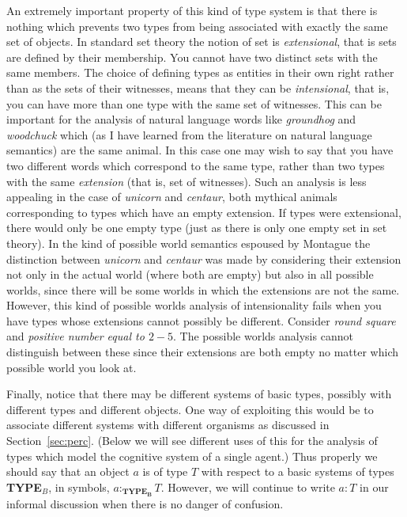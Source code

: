 An extremely important property of this kind of type system is that
there is nothing which prevents two types from being associated with
exactly the same set of objects.  In standard set theory the notion of
set is \textit{extensional}, that is sets are defined by their
membership.  You cannot have two distinct sets with the same members.
The choice of defining types as entities in their own right rather
than as the sets of their witnesses, means that they can be
\textit{intensional}, that is, you can have more than one type with
the same set of witnesses.  This can be important for the analysis of
natural language words like \textit{groundhog} and \textit{woodchuck}
which (as I have learned from the literature on natural language
semantics) are the same animal. In this case one may wish to say that
you have two different words which correspond to the same type, rather
than two types with the same \textit{extension} (that is, set of
witnesses).  Such an analysis is less appealing in the case of
\textit{unicorn} and \textit{centaur}, both mythical animals
corresponding to types which have an empty extension.  If types were
extensional, there would only be one empty type (just as there is only
one empty set in set theory).  In the kind of possible world semantics
espoused by Montague the distinction between \textit{unicorn} and
\textit{centaur} was made by considering their extension not only in
the actual world (where both are empty) but also in all possible
worlds, since there will be some worlds in which the extensions are
not the same.
However, this kind of possible worlds analysis of intensionality fails
when you have types whose extensions cannot possibly be different.
Consider \textit{round square} and \textit{positive number equal to
  $2-5$}.  The possible worlds analysis cannot distinguish between
these since their extensions are both empty no matter which possible
world you look at.

Finally, notice that there may be different systems of basic types,
possibly with different types and different objects.  One way of
exploiting this would be to associate different systems with different
organisms as discussed in Section~\ref{sec:perc}.  (Below we will see
different uses of this for the analysis of types which model the
cognitive system of a single
agent.) Thus properly we should say that an object $a$ is of type $T$
with respect to a basic systems of types {\bf TYPE$_B$}, in symbols,
$a:_{\mathbf{TYPE_B}}T$.  However,  we will continue
to write $a:T$ in our informal discussion when there is no danger of
confusion. 

